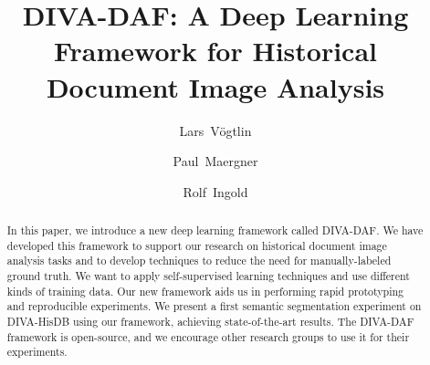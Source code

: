 \documentclass[runningheads]{llncs}
\begin{document}
\title{DIVA-DAF: A Deep Learning Framework for Historical Document Image Analysis}

\begin{comment}
    \author{Anonymous Author\inst{1} \and
    Anonymous Author\inst{1} \and
    Anonymous Author\inst{1}}
    
    \authorrunning{Author et al.}
    
    \institute{\textit{Anonymous Group (AG)} \\
    Anonymous University, Anonymousstreet 1A, Anonymous City, Anonymous Country, \\
    \email{\{firstname.lastname\}@AnonymousUniversity.abc}}
\end{comment}

\author{Lars~V\"ogtlin \and
    Paul~Maergner \and
    Rolf~Ingold}
    



\maketitle              

\begin{acronym}[UMLX]
\end{acronym} 
\begin{abstract}
In this paper, we introduce a new deep learning framework called DIVA-DAF. We have developed this framework to support our research on historical document image analysis tasks and to develop techniques to reduce the need for manually-labeled ground truth. We want to apply self-supervised learning techniques and use different kinds of training data. Our new framework aids us in performing rapid prototyping and reproducible experiments. We present a first semantic segmentation experiment on DIVA-HisDB using our framework, achieving state-of-the-art results. The DIVA-DAF framework is open-source, and we encourage other research groups to use it for their experiments.




\end{abstract}     
\end{document}
